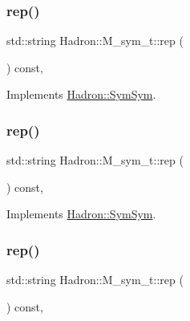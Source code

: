 \subsubsection{\texorpdfstring{rep()}{rep()}\hspace{0.1cm}{\footnotesize\ttfamily [3/5]}}
{\footnotesize\ttfamily std\+::string Hadron\+::\+M\+\_\+sym\+\_\+t\+::rep (\begin{DoxyParamCaption}{ }\end{DoxyParamCaption}) const\hspace{0.3cm}{\ttfamily [inline]}, {\ttfamily [virtual]}}



Implements \mbox{\hyperlink{structHadron_1_1SymSym_aa6e588740862036933a9efe085a5e5e5}{Hadron\+::\+Sym\+Sym}}.

\mbox{\label{structHadron_1_1M__sym__t_ad90bc816709bb65ec3e0b804090fbefe}} 
\subsubsection{\texorpdfstring{rep()}{rep()}\hspace{0.1cm}{\footnotesize\ttfamily [4/5]}}
{\footnotesize\ttfamily std\+::string Hadron\+::\+M\+\_\+sym\+\_\+t\+::rep (\begin{DoxyParamCaption}{ }\end{DoxyParamCaption}) const\hspace{0.3cm}{\ttfamily [inline]}, {\ttfamily [virtual]}}



Implements \mbox{\hyperlink{structHadron_1_1SymSym_aa6e588740862036933a9efe085a5e5e5}{Hadron\+::\+Sym\+Sym}}.

\mbox{\label{structHadron_1_1M__sym__t_ad90bc816709bb65ec3e0b804090fbefe}} 
\subsubsection{\texorpdfstring{rep()}{rep()}\hspace{0.1cm}{\footnotesize\ttfamily [5/5]}}
{\footnotesize\ttfamily std\+::string Hadron\+::\+M\+\_\+sym\+\_\+t\+::rep (\begin{DoxyParamCaption}{ }\end{DoxyParamCaption}) const\hspace{0.3cm}{\ttfamily [inline]}, {\ttfamily [virtual]}}



